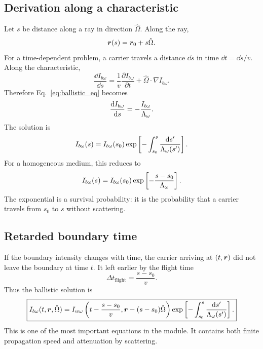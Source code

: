 \documentclass[11pt]{article}
\begin{document}
\subsection{Derivation along a characteristic}
Let \(s\) be distance along a ray in direction \(\hat{\Omega}\). Along the ray,
\begin{equation}
    \bm{r}(s)=\bm{r}_0+s\hat{\Omega}.
\end{equation}
For a time-dependent problem, a carrier travels a distance \(\dd s\) in time \(\dd t=\dd s/v\). Along the characteristic,
\begin{equation}
    \frac{\dd I_{b\omega}}{\dd s}
    =\frac{1}{v}\frac{\partial I_{b\omega}}{\partial t}
    +\hat{\Omega}\cdot\nabla I_{b\omega}.
\end{equation}
Therefore Eq.~\eqref{eq:ballistic_eq} becomes
\begin{equation}
    \frac{\mathop{}\!\mathrm{d} I_{b\omega}}{\mathop{}\!\mathrm{d} s}=-\frac{I_{b\omega}}{\Lambda_\omega}.
\end{equation}
The solution is
\begin{equation}
    I_{b\omega}(s)=I_{b\omega}(s_0)\exp\left[-\int_{s_0}^{s}\frac{\mathop{}\!\mathrm{d} s'}{\Lambda_\omega(s')}\right].
\end{equation}
For a homogeneous medium, this reduces to
\begin{equation}
    I_{b\omega}(s)=I_{b\omega}(s_0)\exp\left[-\frac{s-s_0}{\Lambda_\omega}\right].
\end{equation}
The exponential is a survival probability: it is the probability that a carrier travels from \(s_0\) to \(s\) without scattering.

\subsection{Retarded boundary time}
If the boundary intensity changes with time, the carrier arriving at \((t,\bm{r})\) did not leave the boundary at time \(t\). It left earlier by the flight time
\begin{equation}
    \Delta t_{\mathrm{flight}}=\frac{s-s_0}{v}.
\end{equation}
Thus the ballistic solution is
\begin{equation}
    \boxed{I_{b\omega}(t,\bm{r},\hat{\Omega})
    =I_{w\omega}\left(t-\frac{s-s_0}{v},\bm{r}-(s-s_0)\hat{\Omega}\right)
    \exp\left[-\int_{s_0}^{s}\frac{\mathop{}\!\mathrm{d} s'}{\Lambda_\omega(s')}\right].}
    \label{eq:ballistic_solution}
\end{equation}
This is one of the most important equations in the module. It contains both finite propagation speed and attenuation by scattering.
\end{document}
